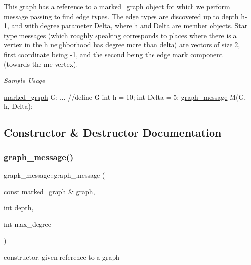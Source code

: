 This graph has a reference to a \hyperlink{classmarked__graph}{marked\+\_\+graph} object for which we perform message passing to find edge types. The edge types are discovered up to depth h-\/1, and with degree parameter Delta, where h and Delta are member objects. Star type messages (which roughly speaking corresponds to places where there is a vertex in the h neighborhood has degree more than delta) are vectors of size 2, first coordinate being -\/1, and the second being the edge mark component (towards the \textquotesingle{}me\textquotesingle{} vertex).

{\itshape Sample Usage}


\begin{DoxyCode}
\hyperlink{classmarked__graph}{marked\_graph} G;
... \textcolor{comment}{//define G}
\textcolor{keywordtype}{int} h = 10;
\textcolor{keywordtype}{int} Delta = 5; 
\hyperlink{classgraph__message}{graph\_message} M(G, h, Delta);
\end{DoxyCode}
 

\subsection{Constructor \& Destructor Documentation}
\mbox{\label{classgraph__message_a792e738b94a19f914e5495c416defe4d}} 
\subsubsection{\texorpdfstring{graph\+\_\+message()}{graph\_message()}\hspace{0.1cm}{\footnotesize\ttfamily [1/2]}}
{\footnotesize\ttfamily graph\+\_\+message\+::graph\+\_\+message (\begin{DoxyParamCaption}\item[{const \hyperlink{classmarked__graph}{marked\+\_\+graph} \&}]{graph,  }\item[{int}]{depth,  }\item[{int}]{max\+\_\+degree }\end{DoxyParamCaption})\hspace{0.3cm}{\ttfamily [inline]}}



constructor, given reference to a graph 


